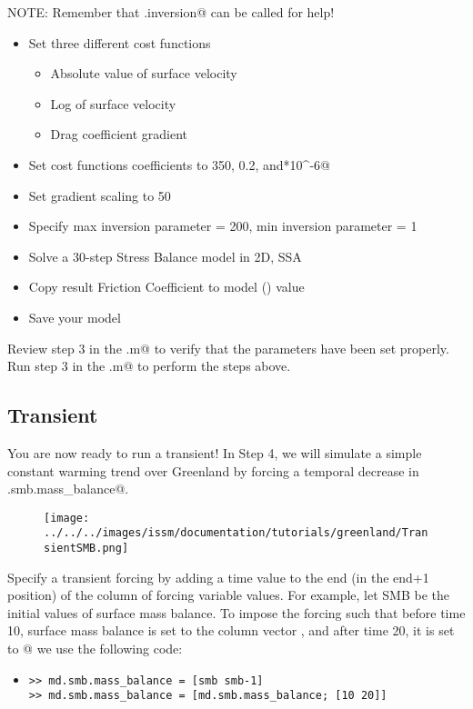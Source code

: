 NOTE: Remember that \verb@md.inversion@ can be called for help!
\begin{itemize}
	\item Set three different cost functions
		\begin{itemize}
			\item Absolute value of surface velocity
			\item Log of surface velocity
			\item Drag coefficient gradient
		\end{itemize}
	\item Set cost functions coefficients to 350, 0.2, and*10^-6@
	\item Set gradient scaling to 50
	\item Specify max inversion parameter = 200, min inversion parameter = 1
	\item Solve a 30-step Stress Balance model in 2D, SSA
	\item Copy result Friction Coefficient to model (\verb@md@) value
	\item Save your model
\end{itemize}

Review step 3 in the \verb@runme.m@ to verify that the parameters have been set properly. Run step 3 in the \verb@runme.m@ to perform the steps above.
\subsection{Transient} %
You are now ready to run a transient! In Step 4, we will simulate a simple constant warming trend over Greenland by forcing a temporal decrease in \verb@md.smb.mass_balance@.

\begin{figure}[H]
	\begin{center}
		\texttt{[image: ../../../images/issm/documentation/tutorials/greenland/TransientSMB.png]}
	\end{center}
\end{figure}

Specify a transient forcing by adding a time value to the end (in the end+1 position) of the column of forcing variable values. For example, let SMB be the initial values of surface mass balance. To impose the forcing such that before time 10, surface mass balance is set to the column vector \verb@smb@, and after time 20, it is set to @ we use the following code:
\begin{itemize}
	\item \begin{verbatim}>> md.smb.mass_balance = [smb smb-1]
>> md.smb.mass_balance = [md.smb.mass_balance; [10 20]]\end{verbatim}
\end{itemize}


